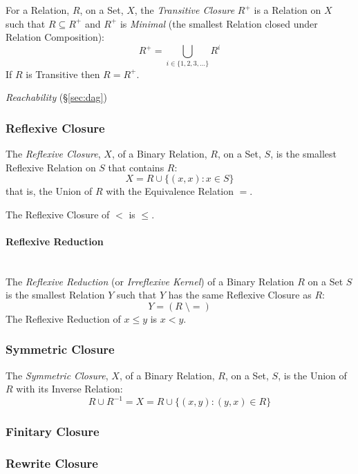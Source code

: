 For a Relation, $R$, on a Set, $X$, the \emph{Transitive Closure}
$R^+$ is a Relation on $X$ such that $R \subseteq R^+$ and $R^+$ is
\emph{Minimal} (the smallest Relation closed under Relation
Composition):
\[
  R^+ = \bigcup_{i \in \{1,2,3,...\}} R^i
\]
If $R$ is Transitive then $R = R^+$.

\emph{Reachability} (\S\ref{sec:dag})



\subsubsection{Reflexive Closure}\label{sec:reflexive_closure}

The \emph{Reflexive Closure}, $X$, of a Binary Relation, $R$, on a
Set, $S$, is the smallest Reflexive Relation on $S$ that contains $R$:
\[
  X = R \cup \{(x,x) : x \in S\}
\]
that is, the Union of $R$ with the Equivalence Relation $=$.

The Reflexive Closure of $<$ is $\leq$.



\paragraph{Reflexive Reduction}\label{sec:reflexive_reduction}
\hfill \\

The \emph{Reflexive Reduction} (or \emph{Irreflexive Kernel}) of a
Binary Relation $R$ on a Set $S$ is the smallest Relation $Y$ such
that $Y$ has the same Reflexive Closure as $R$:
\[
  Y = (R\;\setminus=)
\]
The Reflexive Reduction of $x \leq y$ is $x < y$.



\subsubsection{Symmetric Closure}\label{sec:symmetric_closure}

The \emph{Symmetric Closure}, $X$, of a Binary Relation, $R$, on a
Set, $S$, is the Union of $R$ with its Inverse Relation:
\[
  R \cup R^{-1} = X = R \cup \{(x,y) : (y,x) \in R\}
\]



\subsubsection{Finitary Closure}\label{sec:finitary_closure}

\subsubsection{Rewrite Closure}\label{sec:rewrite_closure}

